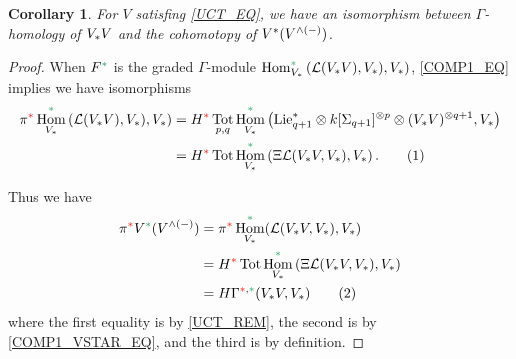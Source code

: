 \documentclass[11pt,reqno
,draft
]{amsart}
\numberwithin{equation}{section}
\numberwithin{figure}{section}
\newtheorem{corollary}[equation]{Corollary}%
\theoremstyle{definition} %
\DeclareMathOperator{\Hom}{Hom}%
\newcommand{\Ksi}{\Xi}
\newcommand{\Lie}{\mathrm{Lie}}
\newcommand{\Loday}{\mathcal L}
\newcommand{\redstar}{{\color{red}\**}}
\newcommand{\greenstar}{{\color{ForestGreen}\**}}
\DeclareMathOperator{\Tot}{Tot}
\begin{document}
\begin{corollary}
        \label{COMP_COR}
        For $V$ satisfing \cref{UCT_EQ},
        we have an isomorphism between $\Gamma$-homology of $V_{\**}V$ and the cohomotopy of $V^{\**}(V^{\wedge (-)})$. %
\end{corollary}
\begin{proof}
        When $F^{\greenstar}$ is the graded $\Gamma$-module $\Hom^{\greenstar}_{V_{\**}}\left( \Loday(V_{\**}V), V_{\**}), V_{\**} \right)$,
        \cref{COMP1_EQ} implies we have isomorphisms
        \begin{align*}
          \pi^{\redstar} \Hom^{\greenstar}_{V_{\**}}\left( \Loday(V_{\**}V), V_{\**}), V_{\**} \right)
          & =
            H^{\redstar} \Tot_{p,q} \Hom^{\greenstar}_{V_{\**}} \left( \Lie_{q+1}^{\**} \otimes k[\Sigma_{q+1}]^{\otimes p} \otimes (V_{\**}V)^{\otimes q+1}, V_{\**} \right) \\
          & =
            H^{\redstar} \Tot \Hom^{\greenstar}_{V_{\**}} \left( \Ksi \Loday(V_{\**}V, V_{\**}), V_{\**} \right).
            \stepcounter{equation}\tag{\theequation}\label{COMP1_VSTAR_EQ}\\
        \end{align*}
        
        Thus we have
        \begin{align*}
          \pi^{\redstar} V^{\greenstar}(V^{\wedge (-)})
          &= \pi^{\redstar} \Hom^{\greenstar}_{V_{\**}}(\Loday(V_{\**}V, V_{\**}), V_{\**}) \\
          &= H^{\redstar} \Tot \Hom^{\greenstar}_{V_{\**}}\left( \Ksi \Loday(V_{\**}V, V_{\**}), V_{\**} \right) \\
          &= H\Gamma^{\redstar, \greenstar}(V_{\**}V, V_{\**})
            \stepcounter{equation}\tag{\theequation}\label{COMP_EQ}\\
        \end{align*}
        where the first equality is by \cref{UCT_REM},
        the second is by \cref{COMP1_VSTAR_EQ},
        and the third is by definition.        
\end{proof}
\end{document}
